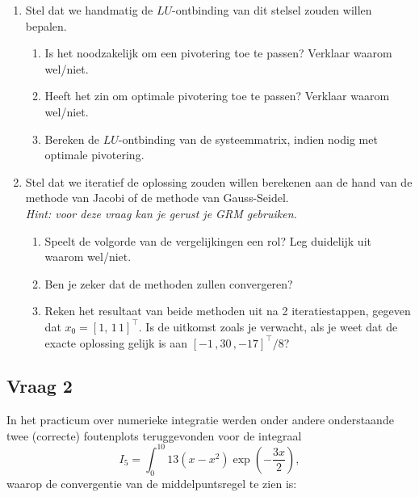 \documentclass[kulak]{kulakarticle}
\begin{document}
	\begin{enumerate}

		\item Stel dat we handmatig de \(LU\)-ontbinding van dit stelsel zouden willen bepalen.
		\begin{enumerate}
			\item Is het noodzakelijk om een pivotering toe te passen? Verklaar waarom wel/niet.
			\item Heeft het zin om optimale pivotering toe te passen? Verklaar waarom wel/niet.
			\item Bereken de \(LU\)-ontbinding van de systeemmatrix, indien nodig met optimale pivotering.
		\end{enumerate}

		\item Stel dat we iteratief de oplossing zouden willen berekenen aan de hand van de methode van Jacobi of de methode van Gauss-Seidel.\\\textit{Hint: voor deze vraag kan je gerust je GRM gebruiken.}
		\begin{enumerate}
			\item Speelt de volgorde van de vergelijkingen een rol? Leg duidelijk uit waarom wel/niet.
			\item Ben je zeker dat de methoden zullen convergeren?
			\item Reken het resultaat van beide methoden uit na 2 iteratiestappen, gegeven dat \(x_0 = [1, \, 1 \, 1]^\top\). Is de uitkomst zoals je verwacht, als je weet dat de exacte oplossing gelijk is aan \([-1 \,, 30 \,, -17]^\top /8\)?
		\end{enumerate}

	\end{enumerate}

	\newpage

	\subsection*{Vraag 2}

	In het practicum over numerieke integratie werden onder andere onderstaande twee (correcte) foutenplots teruggevonden voor de integraal \[I_5 = \int_{0}^{10} 13(x-x^2)\exp\left(-\frac{3x}{2}\right),\]waarop de convergentie van de middelpuntsregel te zien is:
\end{document}
